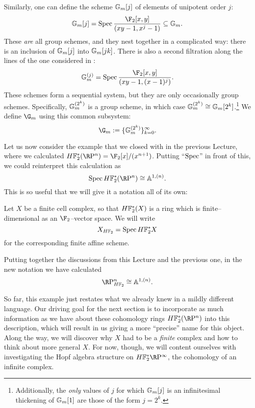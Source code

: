 \begin{example}
Similarly, one can define the scheme \(\mathbb G_m[j]\) of elements of unipotent order \(j\): \[\Gm[j] = \Spec \frac{\F_2[x,y]}{(xy - 1, x^j - 1)} \subseteq \Gm.\]  These \emph{are} all group schemes, and they nest together in a complicated way: there is an inclusion of \(\mathbb G_m[j]\) into \(\mathbb G_m[jk]\).  There is also a second filtration along the lines of the one considered in : \[\Gm^{(j)} = \Spec \frac{\F_2[x,y]}{(xy - 1, (x - 1)^j)}.\]  These schemes form a sequential system, but they are only occasionally group schemes.  Specifically, \(\mathbb G_m^{(2^k)}\) is a group scheme, in which case \(\mathbb G_m^{(2^k)} \cong \mathbb G_m[2^k]\).\footnote{Additionally, the \emph{only} values of \(j\) for which \(\mathbb G_m[j]\) is an infinitesimal thickening of \(\mathbb G_m[1]\) are those of the form \(j = 2^k\).}  We define \(\G_m\) using this common subsystem: \[\G_m := \{\Gm^{(2^k)}\}_{k=0}^\infty.\]
\end{example}

Let us now consider the example that we closed with in the previous Lecture, where we calculated \(\HFtwo^*(\RP^n) = \F_2[x] / (x^{n+1})\).  Putting ``\(\operatorname{Spec}\)'' in front of this, we could reinterpret this calculation as \[\Spec \HFtwo^*(\RP^n) \cong \mathbb A^{1, (n)}.\]  This is so useful that we will give it a notation all of its own:

\begin{definition}\label{HF2SchemeForFiniteCplx}
Let \(X\) be a finite cell complex, so that \(\HFtwo^*(X)\) is a ring which is finite--dimensional as an \(\F_2\)--vector space.  We will write \[X_{\HFtwo} = \Spec \HFtwo^* X\] for the corresponding finite affine scheme.
\end{definition}

\begin{example}
Putting together the discussions from this Lecture and the previous one, in the new notation we have calculated \[\RP^n_{\HFtwo} \cong \mathbb A^{1, (n)}.\]
\end{example}

So far, this example just restates what we already knew in a mildly different language.  Our driving goal for the next section is to incorporate as much information as we have about these cohomology rings \(\HFtwo^* (\RP^n)\) into this description, which will result in us giving a more ``precise'' name for this object.  Along the way, we will discover why \(X\) had to be a \emph{finite} complex and how to think about more general \(X\).  For now, though, we will content ourselves with investigating the Hopf algebra structure on \(\HFtwo^* \RP^\infty\), the cohomology of an infinite complex.

